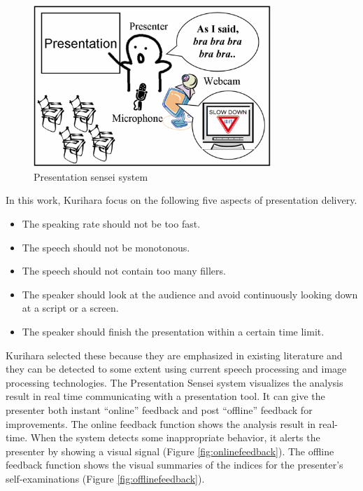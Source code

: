 \begin{figure}[htbp]
  \centering\includegraphics[width=0.8\textwidth]{./img/sensei.png}
  \caption[Presentation sensei system]{Presentation sensei system \cite{Kurihara2007}}
  \label{fig:sensei}
\end{figure}

\par In this work, Kurihara focus on the following five aspects of presentation delivery.
\begin{itemize}
  \item The speaking rate should not be too fast.
  \item The speech should not be monotonous.
  \item The speech should not contain too many fillers.
  \item The speaker should look at the audience and avoid continuously looking down at a script or a screen.
  \item The speaker should finish the presentation within a certain time limit.
\end{itemize}

\par Kurihara selected these because they are emphasized in existing literature and they can be detected to some extent using current speech processing and image processing technologies. The Presentation Sensei system visualizes the analysis result in real time communicating with a presentation tool. It can give the presenter both instant “online” feedback and post “offline” feedback for improvements. The online feedback function shows the analysis result in real-time. When the system detects some inappropriate behavior, it alerts the presenter by showing a visual signal (Figure \ref{fig:onlinefeedback}). The offline feedback function shows the visual summaries of the indices for the presenter’s self-examinations (Figure \ref{fig:offlinefeedback}).

